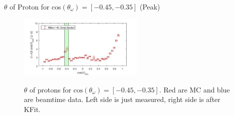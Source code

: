 \documentclass[
		10pt
		]{beamer}
\begin{document}
\begin{frame}{$ \theta$ of Proton for cos$(\theta_{\omega})=[-0.45,-0.35]$ (Peak)}
	
	\begin{figure}
		\hspace{0cm}  \vspace{-1cm}
		\includegraphics[width=6cm]{Plots/6}
	\end{figure}
	
	
	\begin{figure}%
		\centering
		\qquad
		\captionsetup{labelformat=empty}
		\caption{$\theta$ of protons for $\textrm{cos}(\theta_{\omega}) = [-0.45, -0.35] $. Red are MC and blue are beamtime data. Left side is just measured, right side is after KFit.}%

	\end{figure}
	
\end{frame}
\end{document}
